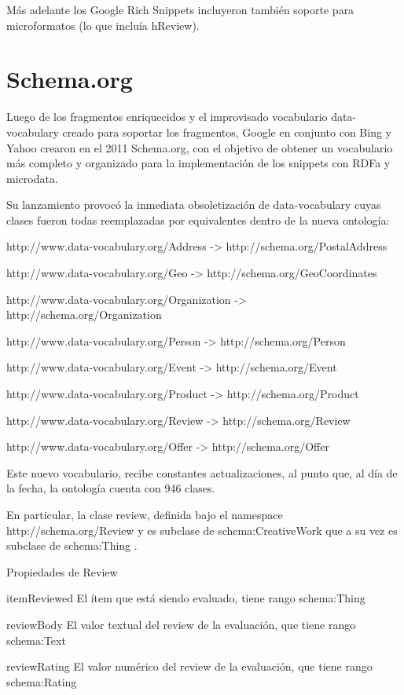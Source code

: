 Más adelante los Google Rich Snippets incluyeron también soporte para microformatos (lo que incluía hReview). 


\section{Schema.org}
\label{section:schema}

Luego de los fragmentos enriquecidos y el improvisado vocabulario data-vocabulary creado para soportar los fragmentos, Google 
en conjunto con Bing y Yahoo crearon en el 2011 Schema.org, con el objetivo de obtener un vocabulario más completo y 
organizado para la implementación de los snippets con RDFa y microdata.

Su lanzamiento provocó la inmediata obsoletización de data-vocabulary cuyas clases fueron todas reemplazadas por equivalentes 
dentro de la nueva ontología:

http://www.data-vocabulary.org/Address -> http://schema.org/PostalAddress

http://www.data-vocabulary.org/Geo -> http://schema.org/GeoCoordinates

http://www.data-vocabulary.org/Organization -> http://schema.org/Organization

http://www.data-vocabulary.org/Person -> http://schema.org/Person

http://www.data-vocabulary.org/Event -> http://schema.org/Event

http://www.data-vocabulary.org/Product -> http://schema.org/Product

http://www.data-vocabulary.org/Review -> http://schema.org/Review

http://www.data-vocabulary.org/Offer -> http://schema.org/Offer

Este nuevo vocabulario, recibe constantes actualizaciones, al punto que, al día de la fecha, la ontología cuenta con 946 clases. 

En particular, la clase review, definida bajo el namespace http://schema.org/Review y es subclase de schema:CreativeWork 
que a su vez es subclase de schema:Thing .

Propiedades de Review

itemReviewed	El ítem que está siendo evaluado, tiene rango schema:Thing 

reviewBody 	El valor textual del review de la evaluación, que tiene rango schema:Text 

reviewRating 	El valor numérico del review de la evaluación, que tiene rango schema:Rating 


